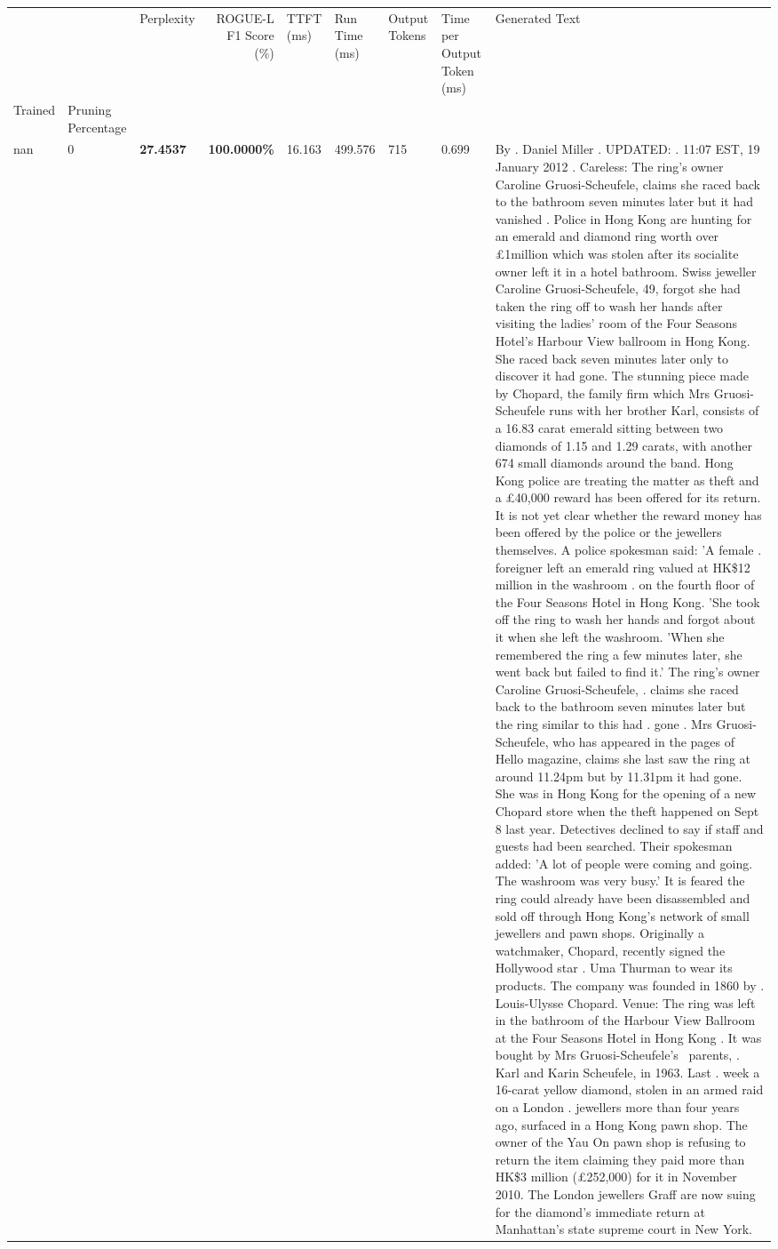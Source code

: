 \begin{table}[H]
\label{tab:evaluation-pipeline-2}
\begin{tabular}{lllrlllll}
\toprule
 &  & Perplexity & ROGUE-L F1 Score (\%) & TTFT (ms) & Run Time (ms) & Output Tokens & Time per Output Token (ms) & Generated Text \\
Trained & Pruning Percentage &  &  &  &  &  &  &  \\
\midrule
nan & 0 & \bfseries 27.4537 & \bfseries 100.0000\% & 16.163 & 499.576 & 715 & 0.699 & By . Daniel Miller . UPDATED: . 11:07 EST, 19 January 2012 . Careless: The ring's owner Caroline Gruosi-Scheufele, claims she raced back to the bathroom seven minutes later but it had vanished . Police in Hong Kong are hunting for an emerald and diamond ring worth over £1million which was stolen after its socialite owner left it in a hotel bathroom. Swiss jeweller Caroline Gruosi-Scheufele, 49, forgot she had taken the ring off to wash her hands after visiting the ladies' room of the Four Seasons Hotel's Harbour View ballroom in Hong Kong. She raced back seven minutes later only to discover it had gone. The stunning piece made by Chopard, the family firm which Mrs Gruosi-Scheufele runs with her brother Karl, consists of a 16.83 carat emerald sitting between two diamonds of 1.15 and 1.29 carats, with another 674 small diamonds around the band. Hong Kong police are treating the matter as theft and a £40,000 reward has been offered for its return. It is not yet clear whether the reward money has been offered by the police or the jewellers themselves. A police spokesman said: 'A female . foreigner left an emerald ring valued at HK\$12 million in the washroom . on the fourth floor of the Four Seasons Hotel in Hong Kong. 'She took off the ring to wash her hands and forgot about it when she left the washroom. 'When she remembered the ring a few minutes later, she went back but failed to find it.' The ring's owner Caroline Gruosi-Scheufele, . claims she raced back to the bathroom seven minutes later but the ring similar to this had . gone . Mrs Gruosi-Scheufele, who has appeared in the pages of Hello magazine, claims she last saw the ring at around 11.24pm but by 11.31pm it had gone. She was in Hong Kong for the opening of a new Chopard store when the theft happened on Sept 8 last year. Detectives declined to say if staff and guests had been searched. Their spokesman added: 'A lot of people were coming and going. The washroom was very busy.' It is feared the ring could already have been disassembled and sold off through Hong Kong's network of small jewellers and pawn shops. Originally a watchmaker, Chopard, recently signed the Hollywood star . Uma Thurman to wear its products. The company was founded in 1860 by . Louis-Ulysse Chopard. Venue: The ring was left in the bathroom of the Harbour View Ballroom at the Four Seasons Hotel in Hong Kong . It was bought by Mrs Gruosi-Scheufele's  parents, . Karl and Karin Scheufele, in 1963. Last . week a 16-carat yellow diamond, stolen in an armed raid on a London . jewellers more than four years ago, surfaced in a Hong Kong pawn shop. The owner of the Yau On pawn shop is refusing to return the item claiming they paid more than HK\$3 million (£252,000) for it in November 2010. The London jewellers Graff are now suing for the diamond’s immediate return at Manhattan’s state supreme court in New York.

\end{tabular}
\end{table}
